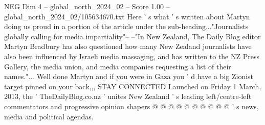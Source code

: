 \begin{textsample}{NEG Dim 4 – global\_north\_2024\_02 – Score 1.00 – global\_north\_2024\_02/105634670.txt}
Here ' s what ' s written about Martyn doing us proud in a portion of the article under the sub-heading..."Journalists globally calling for media impartiality"-- --"In New Zealand, The Daily Blog editor Martyn Bradbury has also questioned how many New Zealand journalists have also been influenced by Israeli media massaging, and has written to the NZ Press Gallery, the media union, and media companies requesting a list of their names."...
Well done Martyn and if you were in Gaza you ' d have a big Zionist target pinned on your back,,, STAY CONNECTED Launched on Friday 1 March, 2013, the ' TheDailyBlog.co.nz ' unites New Zealand ' s leading left/centre-left commentators and progressive opinion shapers @ @ @ @ @ @ @ @ @ @ ' s news, media and political agendas.

\end{textsample}
